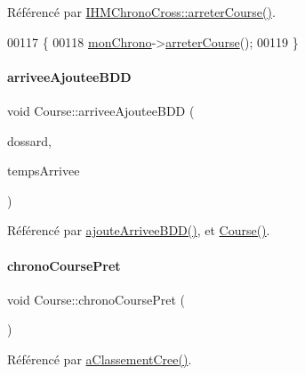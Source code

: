 Référencé par \hyperlink{class_i_h_m_chrono_cross_ad3d8f287d08dd9aa0c6b10c9973672a4}{I\+H\+M\+Chrono\+Cross\+::arreter\+Course()}.


\begin{DoxyCode}
00117 \{
00118     \hyperlink{class_course_a0c9b246b0f1ec612bd6e6c613a94d52b}{monChrono}->\hyperlink{class_chrono_a2a0d899b09eb044caa83b41574ac5edf}{arreterCourse}();
00119 \}
\end{DoxyCode}
\mbox{\label{class_course_aa2f0312e68f57e1437c3257d13af8186}} 
\paragraph{\texorpdfstring{arrivee\+Ajoutee\+B\+DD}{arriveeAjouteeBDD}}
{\footnotesize\ttfamily void Course\+::arrivee\+Ajoutee\+B\+DD (\begin{DoxyParamCaption}\item[{Q\+String}]{dossard,  }\item[{Q\+String}]{temps\+Arrivee }\end{DoxyParamCaption})\hspace{0.3cm}{\ttfamily [signal]}}



Référencé par \hyperlink{class_course_ac99042bf8b20e8d3a54e72c8a80f7ee7}{ajoute\+Arrivee\+B\+D\+D()}, et \hyperlink{class_course_af6317ecab95f8a2eb205b4f91b530992}{Course()}.

\mbox{\label{class_course_ab3f2a2c1bb8ed8a2550dc8fabc59e54e}} 
\paragraph{\texorpdfstring{chrono\+Course\+Pret}{chronoCoursePret}}
{\footnotesize\ttfamily void Course\+::chrono\+Course\+Pret (\begin{DoxyParamCaption}{ }\end{DoxyParamCaption})\hspace{0.3cm}{\ttfamily [signal]}}



Référencé par \hyperlink{class_course_a4a4f788b4ff5ca687c67f29753d26928}{a\+Classement\+Cree()}.

